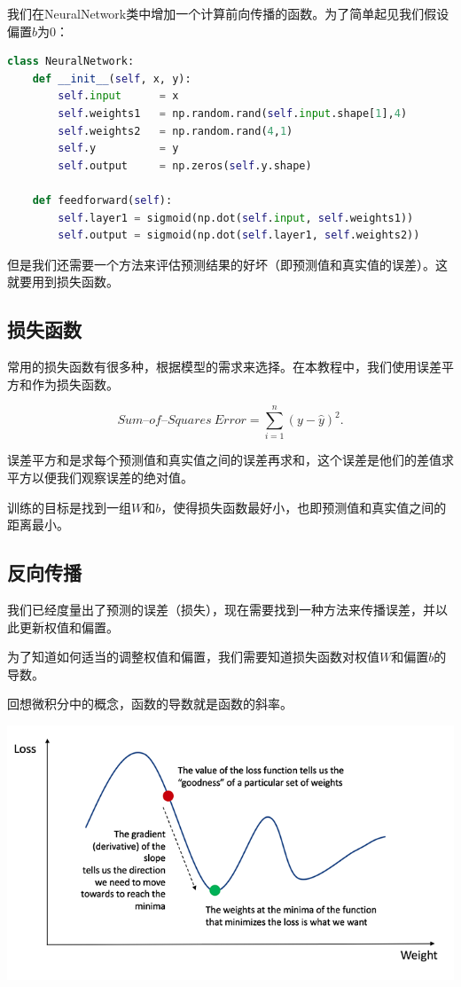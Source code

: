 我们在NeuralNetwork类中增加一个计算前向传播的函数。为了简单起见我们假设偏置$b$为$0$：

\begin{lstlisting}[language=python, breaklines]
class NeuralNetwork:
    def __init__(self, x, y):
        self.input      = x
        self.weights1   = np.random.rand(self.input.shape[1],4) 
        self.weights2   = np.random.rand(4,1)                 
        self.y          = y
        self.output     = np.zeros(self.y.shape)

    def feedforward(self):
        self.layer1 = sigmoid(np.dot(self.input, self.weights1))
        self.output = sigmoid(np.dot(self.layer1, self.weights2))
\end{lstlisting}

但是我们还需要一个方法来评估预测结果的好坏（即预测值和真实值的误差）。这就要用到损失函数。

\subsection{损失函数}

常用的损失函数有很多种，根据模型的需求来选择。在本教程中，我们使用误差平方和作为损失函数。

\begin{equation}
    Sum\text{--}of\text{--}Squares \ Error = \sum_{i=1}^{n}(y-\hat{y})^2.
\end{equation}

误差平方和是求每个预测值和真实值之间的误差再求和，这个误差是他们的差值求平方以便我们观察误差的绝对值。

训练的目标是找到一组$W$和$b$，使得损失函数最好小，也即预测值和真实值之间的距离最小。

\subsection{反向传播}

我们已经度量出了预测的误差（损失），现在需要找到一种方法来传播误差，并以此更新权值和偏置。

为了知道如何适当的调整权值和偏置，我们需要知道损失函数对权值$W$和偏置$b$的导数。

回想微积分中的概念，函数的导数就是函数的斜率。

\noindent\includegraphics[width=\textwidth]{3.png}

